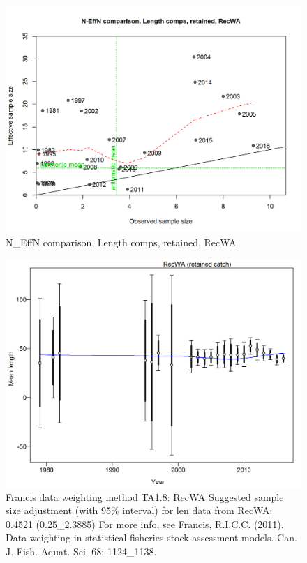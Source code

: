 \documentclass[12pt,]{article}
\begin{document}
\begin{figure}[htbp]
\centering
\includegraphics{./r4ss/plots_mod1/comp_lenfit_sampsize_flt4mkt2.png}
\caption{N\_EffN comparison, Length comps, retained, RecWA
\label{fig:mod1_20_comp_lenfit_sampsize_flt4mkt2}}
\end{figure}

\begin{figure}[htbp]
\centering
\includegraphics{./r4ss/plots_mod1/comp_lenfit_data_weighting_TA1.8_RecWA.png}
\caption{Francis data weighting method TA1.8: RecWA Suggested sample
size adjustment (with 95\% interval) for len data from RecWA: 0.4521
(0.25\_2.3885) For more info, see Francis, R.I.C.C. (2011). Data
weighting in statistical fisheries stock assessment models. Can. J.
Fish. Aquat. Sci. 68: 1124\_1138.
\label{fig:mod1_21_comp_lenfit_data_weighting_TA1.8_RecWA}}
\end{figure}
\end{document}
